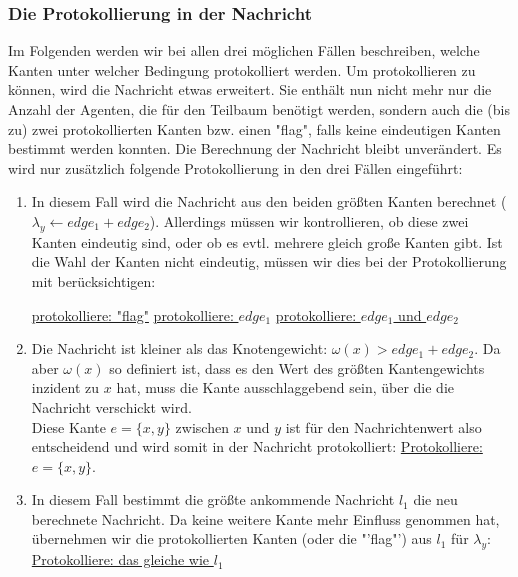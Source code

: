 \subsubsection{Die Protokollierung in der Nachricht}

Im Folgenden werden wir bei allen drei möglichen Fällen beschreiben, welche Kanten unter welcher Bedingung protokolliert werden. Um protokollieren zu können, wird die Nachricht etwas erweitert. Sie enthält nun nicht mehr nur die Anzahl der Agenten, die für den Teilbaum benötigt werden, sondern auch die (bis zu) zwei protokollierten Kanten bzw. einen "flag", falls keine eindeutigen Kanten bestimmt werden konnten. Die Berechnung der Nachricht bleibt unverändert. Es wird nur zusätzlich folgende Protokollierung in den drei Fällen eingeführt: 

\begin{enumerate}[label=\alph*)]
	
	\item In diesem Fall wird die Nachricht aus den beiden größten Kanten berechnet ($\lambda_{y} \gets edge_{1} + edge_{2}$). Allerdings müssen wir kontrollieren, ob diese zwei Kanten eindeutig sind, oder ob es evtl. mehrere gleich große Kanten gibt. Ist die Wahl der Kanten nicht eindeutig, müssen wir dies bei der Protokollierung mit berücksichtigen:\\
	
		\begin{algorithmic}
			\State \uline{protokolliere: "flag"}
			\State \uline{protokolliere: $edge_{1}$}
			\Else
			\State \uline{protokolliere: $edge_{1}$ und $edge_{2}$}
			\EndIf
		\end{algorithmic}
	
	\item Die Nachricht ist kleiner als das Knotengewicht: $\omega(x) > edge_{1}+edge_{2}$. Da aber $\omega(x)$ so definiert ist, dass es den Wert des größten Kantengewichts inzident zu $x$ hat, muss die Kante ausschlaggebend sein, über die die Nachricht verschickt wird. 
	\\
	Diese Kante $e = \{x, y\}$ zwischen $x$ und $y$ ist für den Nachrichtenwert also entscheidend und wird somit in der Nachricht protokolliert: \uline{Protokolliere: $e = \{x, y\}$}.
	
	\item In diesem Fall bestimmt die größte ankommende Nachricht $l_{1}$ die neu berechnete Nachricht. Da keine weitere Kante mehr Einfluss genommen hat, übernehmen wir die protokollierten Kanten (oder die "'flag"') aus $l_{1}$ für $\lambda_{y}$: \uline{Protokolliere: das gleiche wie $l_{1}$}
	
\end{enumerate}
